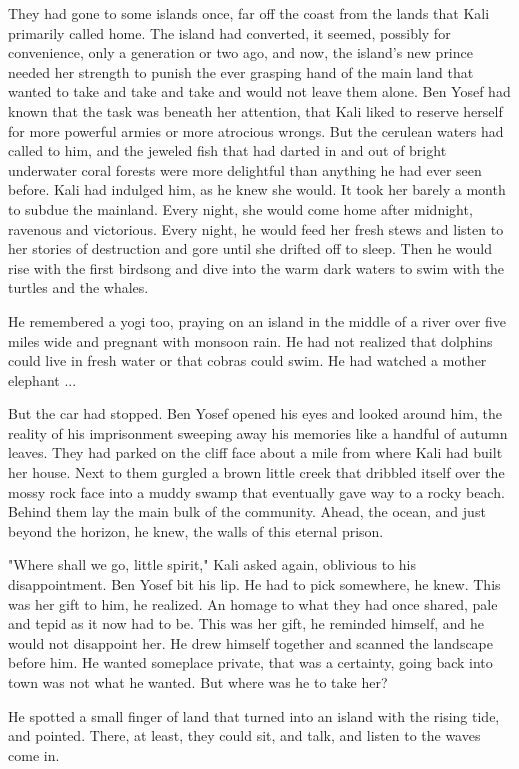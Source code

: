 \documentclass{amsart}
\begin{document}
They had gone to some islands once, far off the coast from the lands that Kali primarily called home. The island had converted, it seemed, possibly for convenience, only a generation or two ago, and now, the island's new prince needed her strength to punish the ever grasping hand of the main land that wanted to take and take and take and would not leave them alone. Ben Yosef had known that the task was beneath her attention, that Kali liked to reserve herself for more powerful armies or more atrocious wrongs. But the cerulean waters had called to him, and the jeweled fish that had darted in and out of bright underwater coral forests were more delightful than anything he had ever seen before. Kali had indulged him, as he knew she would. It took her barely a month to subdue the mainland. Every night, she would come home after midnight, ravenous and victorious. Every night, he would feed her fresh stews and listen to her stories of destruction and gore until she drifted off to sleep. Then he would rise with the first birdsong and dive into the warm dark waters to swim with the turtles and the whales.

He remembered a yogi too, praying on an island in the middle of a river over five miles wide and pregnant with monsoon rain. He had not realized that dolphins could live in fresh water or that cobras could swim. He had watched a mother elephant ...

But the car had stopped. Ben Yosef opened his eyes and looked around him, the reality of his imprisonment sweeping away his memories like a handful of autumn leaves. They had parked on the cliff face about a mile from where Kali had built her house. Next to them gurgled a brown little creek that dribbled itself over the mossy rock face into a muddy swamp that eventually gave way to a rocky beach. Behind them lay the main bulk of the community. Ahead, the ocean, and just beyond the horizon, he knew, the walls of this eternal prison.

"Where shall we go, little spirit," Kali asked again, oblivious to his disappointment. Ben Yosef bit his lip. He had to pick somewhere, he knew. This was her gift to him, he realized. An homage to what they had once shared, pale and tepid as it now had to be. This was her gift, he reminded himself, and he would not disappoint her. He drew himself together and scanned the landscape before him. He wanted someplace private, that was a certainty, going back into town was not what he wanted. But where was he to take her? 

He spotted a small finger of land that turned into an island with the rising tide, and pointed. There, at least, they could sit, and talk, and listen to the waves come in.
\end{document}
